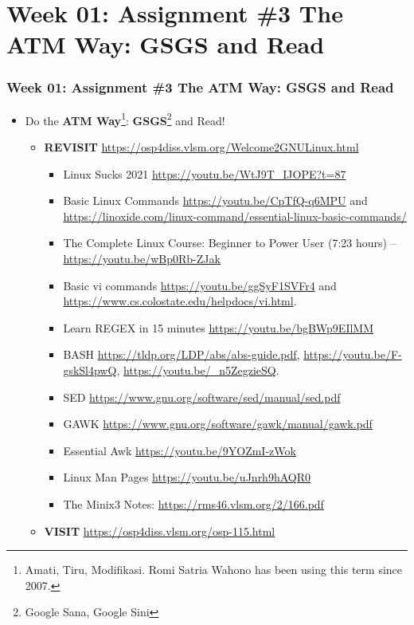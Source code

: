 \documentclass[xcolor=table, notheorems, hyperref={pdfpagelabels=false}]{beamer}
\begin{document}
\section{Week 01: Assignment \#3 The ATM Way: GSGS and Read}
\begin{frame}
\frametitle{Week 01: Assignment \#3 The ATM Way: GSGS and Read}

\begin{itemize}
\item Do the \textbf{ATM Way}\footnote{%
Amati, Tiru, Modifikasi. Romi Satria Wahono has been using this term since 2007.}:
\textbf{GSGS}\footnote{Google Sana, Google Sini} and Read!
\begin{itemize}
\item \textbf{REVISIT} \url{https://osp4diss.vlsm.org/Welcome2GNULinux.html}
\begin{itemize}
\item Linux Sucks 2021 \url{https://youtu.be/WtJ9T_IJOPE?t=87}
\item Basic Linux Commands \url{https://youtu.be/CpTfQ-q6MPU} and
{\scriptsize \url{https://linoxide.com/linux-command/essential-linux-basic-commands/}}
\item The Complete Linux Course: Beginner to Power User (7:23 hours) -- \url{https://youtu.be/wBp0Rb-ZJak}
\item Basic vi commands \url{https://youtu.be/ggSyF1SVFr4} and
\url{https://www.cs.colostate.edu/helpdocs/vi.html}.
\item Learn REGEX in 15 minutes \url{https://youtu.be/bgBWp9EIlMM}
\item BASH 
\url{https://tldp.org/LDP/abs/abs-guide.pdf},
\url{https://youtu.be/F-gskSl4pwQ},
\url{https://youtu.be/_n5ZegzieSQ}.
\item SED \url{https://www.gnu.org/software/sed/manual/sed.pdf}
\item GAWK \url{https://www.gnu.org/software/gawk/manual/gawk.pdf}
\item Essential Awk \url{https://youtu.be/9YOZmI-zWok}
\item Linux Man Pages \url{https://youtu.be/uJnrh9hAQR0}
\item The Minix3 Notes: \url{https://rms46.vlsm.org/2/166.pdf}
\end{itemize}
\item \textbf{VISIT} \url{https://osp4diss.vlsm.org/osp-115.html}
\end{itemize}
\end{itemize}
\end{frame}
\end{document}
